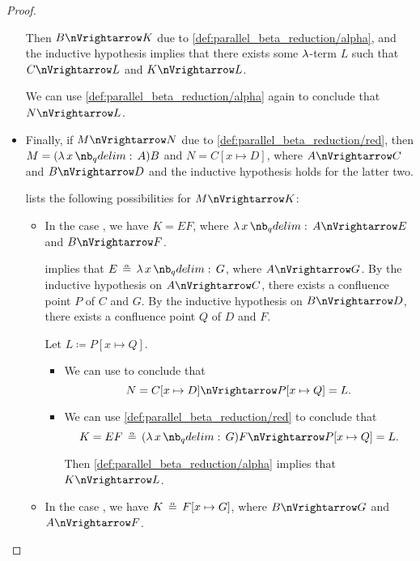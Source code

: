 \begin{proof}
\begin{itemize}
    Then \( B \pred K \) due to \ref{def:parallel_beta_reduction/alpha}, and the inductive hypothesis implies that there exists some \( \mathrm{\lambda} \)-term \( L \) such that \( C \pred L \) and \( K \pred L \).

    We can use \ref{def:parallel_beta_reduction/alpha} again to conclude that \( N \pred L \).

    \item Finally, if \( M \pred N \) due to \ref{def:parallel_beta_reduction/red}, then \( M = (\qabs x A)B \) and \( N = C[x \mapsto D] \), where \( A \pred C \) and \( B \pred D \) and the inductive hypothesis holds for the latter two.

     lists the following possibilities for \( M \pred K \):
    \begin{itemize}
      \item In the case , we have \( K = EF \), where \( \qabs x A \pred E \) and \( B \pred F \).

       implies that \( E \aequiv \qabs x G \), where \( A \pred G \). By the inductive hypothesis on \( A \pred C \), there exists a confluence point \( P \) of \( C \) and \( G \). By the inductive hypothesis on \( B \pred D \), there exists a confluence point \( Q \) of \( D \) and \( F \).

      Let \( L \coloneqq P[x \mapsto Q] \).
      \begin{itemize}
        \item We can use  to conclude that
        \begin{equation*}
          N = C[x \mapsto D] \pred P[x \mapsto Q] = L.
        \end{equation*}

        \item We can use \ref{def:parallel_beta_reduction/red} to conclude that
        \begin{equation*}
          K = EF \aequiv (\qabs x G) F \pred P[x \mapsto Q] = L.
        \end{equation*}

        Then \ref{def:parallel_beta_reduction/alpha} implies that \( K \pred L \).
      \end{itemize}

      \item In the case , we have \( K \aequiv F[x \mapsto G] \), where \( B \pred G \) and \( A \pred F \).


\end{itemize}
\end{itemize}
\end{proof}

